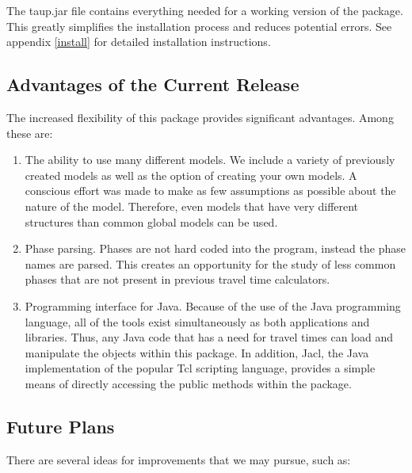 The taup.jar file contains everything needed for a working version of the package.
This greatly simplifies the installation process and reduces potential errors.
See appendix \ref{install} for detailed installation instructions.

\subsection{Advantages of the Current Release}
The increased flexibility of this package provides significant advantages. Among
these are:
\begin{enumerate}
\item The ability to use many different models. We include a variety of previously created
models as well as the option of creating your own models. A conscious effort 
was made to make as few assumptions as possible about the nature of the model. 
Therefore,
even models that have very different structures than common global models can be
used.

\item Phase parsing. Phases are not hard coded into the program, instead the phase
names are parsed. This creates an opportunity for the study of less common
phases that are not present in previous travel time calculators. 

\item Programming interface for Java. Because of the use of the Java programming
language, all of the tools exist simultaneously as both applications and libraries.
Thus, any Java code that has a need for travel times can load and manipulate
the objects within this package. In addition, Jacl, the Java implementation of the popular Tcl scripting language, provides a simple means of directly accessing the public methods within the package.

\end{enumerate}

 
\subsection{Future Plans}

There are several ideas for improvements that we may pursue, such as:

